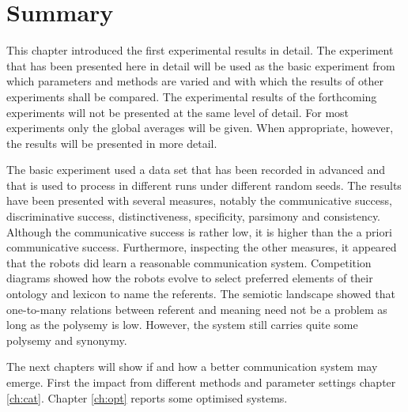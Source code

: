 \section{Summary}

This chapter introduced the first experimental results in detail. The experiment that has been presented here in detail will be used as the basic experiment from which parameters and methods are varied and with which the results of other experiments shall be compared. The experimental results of the forthcoming experiments will not be presented at the same level of detail. For most experiments only the global averages will be given. When appropriate, however, the results will be presented in more detail. 

The basic experiment used a data set that has been recorded in advanced  and that is used to process in different runs under different random seeds. The results have been presented with several measures, notably the communicative success, discriminative success, distinctiveness, specificity, parsimony and consistency. Although the communicative success is rather low, it is higher than the a priori communicative success. Furthermore, inspecting the other measures, it appeared that the robots did learn a reasonable communication system. Competition diagrams showed how the robots evolve to select preferred elements of their ontology and lexicon to name the referents. The semiotic landscape showed that one-to-many relations between referent and meaning need not be a problem as long as the polysemy is low.  However, the system still carries quite some polysemy and synonymy. 

The next chapters will show if and how a better communication system may emerge. First the impact from different methods and parameter settings chapter \ref{ch:cat}. Chapter \ref{ch:opt} reports some optimised systems.



